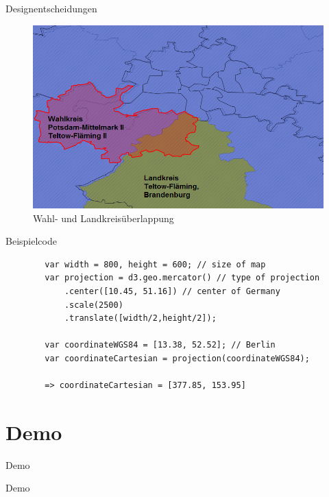 \documentclass[ucs,9pt]{beamer}
\begin{document}
\begin{frame}{Designentscheidungen}
	\begin{figure}[hbtp]
		\centering
		\includegraphics[scale=0.5]{ccissue.png}
		\caption{Wahl- und Landkreisüberlappung}
	\end{figure}
\end{frame}

\begin{frame}[fragile]{Beispielcode}
 	\begin{lstlisting}
		var width = 800, height = 600; // size of map
		var projection = d3.geo.mercator() // type of projection
        	.center([10.45, 51.16]) // center of Germany
        	.scale(2500)
        	.translate([width/2,height/2]);

		var coordinateWGS84 = [13.38, 52.52]; // Berlin
		var coordinateCartesian = projection(coordinateWGS84);

		=> coordinateCartesian = [377.85, 153.95]
  \end{lstlisting}
\end{frame}

\section{Demo}
\begin{frame}{Demo}
	\begin{center}
		\huge Demo	
	\end{center}
\end{frame}
\end{document}
